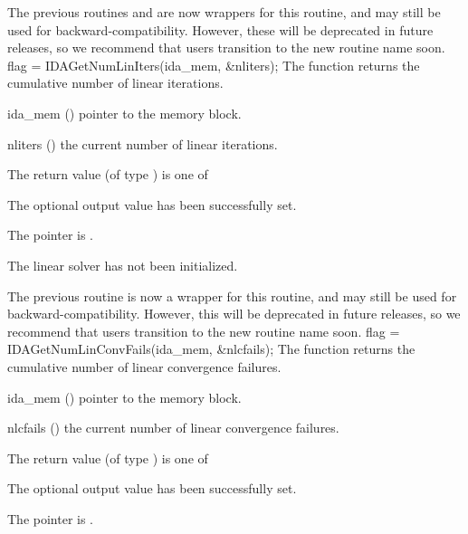 {{  The previous routines  and
   are now wrappers for this routine, and may
  still be used for backward-compatibility.  However, these will be
  deprecated in future releases, so we recommend that users transition
  to the new routine name soon.
}
{
  flag = IDAGetNumLinIters(ida\_mem, \&nliters);
}
{
  The function  returns the
  cumulative number of linear iterations.
}
{
  \begin{args}
  \item[ida\_mem] ()
    pointer to the {\idas} memory block.
  \item[nliters] ()
    the current number of linear iterations.
  \end{args}
}
{
  The return value  (of type ) is one of
  \begin{args}
  \item[\Id{IDALS\_SUCCESS}]
    The optional output value has been successfully set.
  \item[\Id{IDALS\_MEM\_NULL}]
    The  pointer is .
  \item[\Id{IDALS\_LMEM\_NULL}]
    The {\idals} linear solver has not been initialized.
  \end{args}
}
{
  The previous routine  is now a wrapper for
  this routine, and may still be used for backward-compatibility.
  However, this will be deprecated in future releases, so we recommend
  that users transition to the new routine name soon.
}
{
  flag = IDAGetNumLinConvFails(ida\_mem, \&nlcfails);
}
{
  The function  returns the
  cumulative number of linear convergence failures.
}
{
  \begin{args}
  \item[ida\_mem] ()
    pointer to the {\idas} memory block.
  \item[nlcfails] ()
    the current number of linear convergence failures.
  \end{args}
}
{
  The return value  (of type ) is one of
  \begin{args}
  \item[\Id{IDALS\_SUCCESS}]
    The optional output value has been successfully set.
  \item[\Id{IDALS\_MEM\_NULL}]
    The  pointer is .

\end{args}}}
